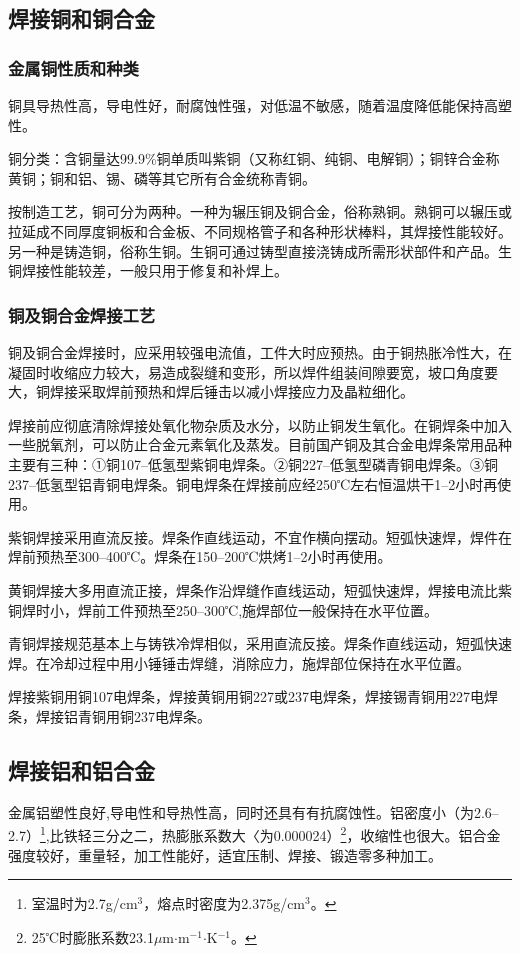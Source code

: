 \documentclass{ctexbook}
\begin{document}
\subsection{焊接铜和铜合金}
\subsubsection{金属铜性质和种类}
铜具导热性高，导电性好，耐腐蚀性强，对低温不敏感，随着温度降低能保持高塑性。

铜分类：含铜量达99.9\%铜单质叫紫铜（又称红铜、纯铜、电解铜）；铜锌合金称黄铜；铜和铝、锡、磷等其它所有合金统称青铜。

按制造工艺，铜可分为两种。一种为辗压铜及铜合金，俗称熟铜。熟铜可以辗压或拉延成不同厚度铜板和合金板、不同规格管子和各种形状棒料，其焊接性能较好。另一种是铸造铜，俗称生铜。生铜可通过铸型直接浇铸成所需形状部件和产品。生铜焊接性能较差，一般只用于修复和补焊上。
\subsubsection{铜及铜合金焊接工艺}
铜及铜合金焊接时，应采用较强电流值，工件大时应预热。由于铜热胀冷性大，在凝固时收缩应力较大，易造成裂缝和变形，所以焊件组装间隙要宽，坡口角度要大，铜焊接采取焊前预热和焊后锤击以减小焊接应力及晶粒细化。

焊接前应彻底清除焊接处氧化物杂质及水分，以防止铜发生氧化。在铜焊条中加入一些脱氧剂，可以防止合金元素氧化及蒸发。目前国产铜及其合金电焊条常用品种主要有三种：①铜107--低氢型紫铜电焊条。②铜227--低氢型磷青铜电焊条。③铜237--低氢型铝青铜电焊条。铜电焊条在焊接前应经250℃左右恒温烘干1--2小时再使用。

紫铜焊接采用直流反接。焊条作直线运动，不宜作横向摆动。短弧快速焊，焊件在焊前预热至300--400℃。焊条在150--200℃烘烤1--2小时再使用。

黄铜焊接大多用直流正接，焊条作沿焊缝作直线运动，短弧快速焊，焊接电流比紫铜焊时小，焊前工件预热至250--300℃,施焊部位一般保持在水平位置。

青铜焊接规范基本上与铸铁冷焊相似，采用直流反接。焊条作直线运动，短弧快速焊。在冷却过程中用小锤锤击焊缝，消除应力，施焊部位保持在水平位置。

焊接紫铜用铜107电焊条，焊接黄铜用铜227或237电焊条，焊接锡青铜用227电焊条，焊接铝青铜用铜237电焊条。
\subsection{焊接铝和铝合金}
金属铝塑性良好,导电性和导热性高，同时还具有有抗腐蚀性。铝密度小（为2.6--2.7）\footnote{室温时为2.7g/cm$^3$，熔点时密度为2.375g/cm$^3$。},比铁轻三分之二，热膨胀系数大〈为0.000024）\footnote{25℃时膨胀系数23.1$\mu$m$\cdot$m$^{−1}$$\cdot$K$^{−1}$。}，收缩性也很大。铝合金强度较好，重量轻，加工性能好，适宜压制、焊接、锻造零多种加工。
\end{document}
